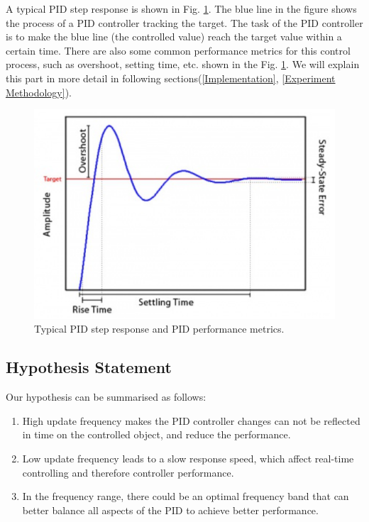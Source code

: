 \documentclass[conference]{IEEEtran}
\begin{document}
A typical PID step response\cite{goodwin2001control} is shown in Fig. \ref{PIDandSettlingTime}. The blue line in the figure shows the process of a PID controller tracking the target. %
The task of the PID controller is to make the blue line (the controlled value) reach the target value within a certain time. There are also some common performance metrics for this control process, such as overshoot, setting time, etc. shown in the 
 Fig. \ref{PIDandSettlingTime}. We will explain this part in more detail in following sections(\ref{Implementation}, \ref{Experiment Methodology}).
\begin{figure}[htbp]
\centerline{\includegraphics[width=0.9\linewidth]{Report/Pic/PIDandSettlingTime.png}}
\caption{Typical PID step response and PID performance metrics.}
\label{PIDandSettlingTime}
\end{figure}

\subsection{Hypothesis Statement}
Our hypothesis can be summarised as follows:
\begin{enumerate}
    \item High update frequency makes the PID controller changes can not be reflected in time on the controlled object, and reduce the performance.
    \item Low update frequency leads to a slow response speed\cite{knospe2006pid}, which affect real-time controlling and therefore controller performance.
    \item In the frequency range, there could be an optimal frequency band that can better balance all aspects of the PID to achieve better performance.
\end{enumerate}
\end{document}
